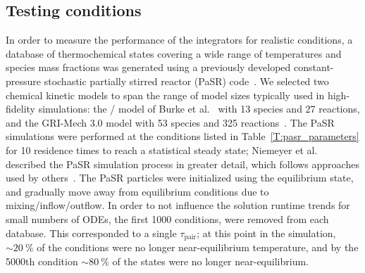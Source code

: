 \documentclass[final,twocolumn]{elsarticle}
\begin{document}
\subsection{Testing conditions}
\label{S:pasr_conditions}

In order to measure the performance of the integrators for realistic conditions, a database of thermochemical states covering a wide range of temperatures and species mass fractions was generated using a previously developed constant-pressure stochastic partially stirred reactor (PaSR) code~\cite{Niemeyer:2015ws}.
We selected two chemical kinetic models to span the range of model sizes typically used in high-fidelity simulations: the \slash{} model of Burke et al.~\cite{Burke:2011fh} with 13 species and 27 reactions, and the GRI-Mech 3.0 model with 53 species and 325 reactions~\cite{smith_gri-mech_30}.
The PaSR simulations were performed at the conditions listed in Table~\ref{T:pasr_parameters} for 10 residence times to reach a statistical steady state; Niemeyer et al.~\cite{Niemeyer:2015ws} described the PaSR simulation process in greater detail, which follows approaches used by others~\cite{Chen:1997ta,Pope:1997wu,Ren:2014cd}.
The PaSR particles were initialized using the equilibrium state, and gradually move away from equilibrium conditions due to mixing\slash inflow\slash outflow.
In order to not influence the solution runtime trends for small numbers of ODEs, the first \num{1000} conditions, were removed from each database.
This corresponded to a single $\tau_\text{pair}$; at this point in the simulation, $\sim\SI{20}{\percent}$ of the conditions were no longer near-equilibrium temperature, and by the \num{5000}th condition $\sim\SI{80}{\percent}$ of the states were no longer near-equilibrium.

%
\end{document}
